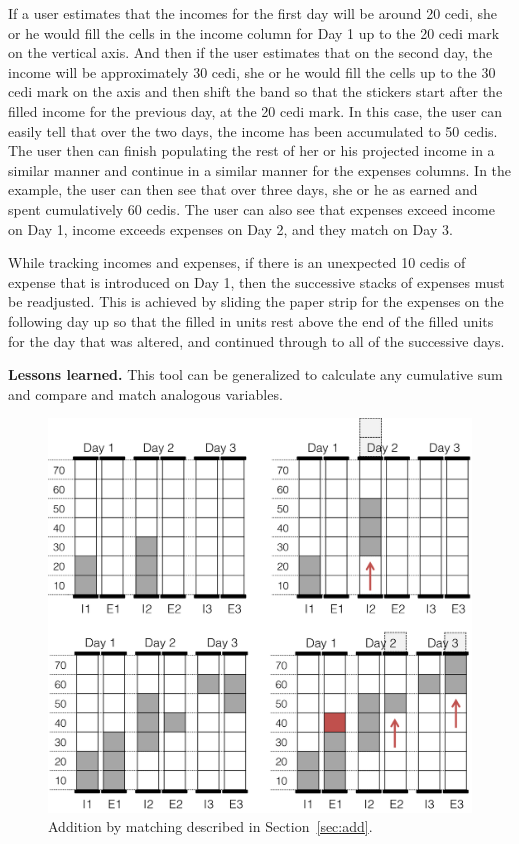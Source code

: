 \documentclass{sig-alternate}
\begin{document}
If a user estimates that the incomes for the first day will be around 20 cedi, she or he would fill the cells in the income column for Day 1 up to the 20 cedi mark on the vertical axis. And then if the user estimates that on the second day, the income will be approximately 30 cedi, she or he would fill the cells up to the 30 cedi mark on the axis and then shift the band so that the stickers start after the filled income for the previous day, at the 20 cedi mark. In this case, the user can easily tell that over the two days, the income has been accumulated to 50 cedis. The user then can finish populating the rest of her or his projected income in a similar manner and continue in a similar manner for the expenses columns. In the example, the user can then see that over three days, she or he as earned and spent cumulatively 60 cedis. The user can also see that expenses exceed income on Day 1, income exceeds expenses on Day 2, and they match on Day 3.

While tracking incomes and expenses, if there is an unexpected 10 cedis of expense that is introduced on Day 1, then the successive stacks of expenses must be readjusted. This is achieved by sliding the paper strip for the expenses on the following day up so that the filled in units rest above the end of the filled units for the day that was altered, and continued through to all of the successive days.


\textbf{Lessons learned.} This tool can be generalized to calculate any cumulative sum and compare and match analogous variables.

\begin{figure}
\centering
\includegraphics[width=.9\linewidth]{img/add.png}
\caption{Addition by matching described in Section~\ref{sec:add}.}
\label{fig:add}
\end{figure}
\end{document}
